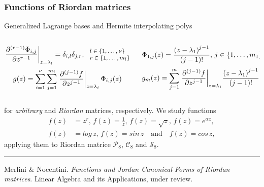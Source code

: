 \documentclass[9pt]{beamer}
\begin{document}
\begin{frame}[fragile]
\frametitle{Functions of Riordan matrices}
Generalized Lagrange bases and Hermite interpolating polys
\begin{columns}
    \begin{column}{0.5\textwidth}
        \begin{displaymath}
        \footnotesize
        \left. \frac{\partial^{(r-1)}{\Phi_{i,j}}}{\partial{z}^{r-1}} \right|_{z=\lambda_{l}} = \delta_{i,l}\delta_{j,r},
        \, 
        \begin{array}{l} 
            l\in \lbrace 1, \ldots, \nu \rbrace \\
            r \in \lbrace 1, \ldots, m_{l} \rbrace
        \end{array}
        \end{displaymath}
        \begin{displaymath}
        \footnotesize
        g(z) = \sum_{i=1}^{\nu}{\sum_{j=1}^{m_{i}}{ \left.
        \frac{\partial^{(j-1)}{f}}{\partial{z}^{j-1}} \right|_{z=\lambda_{i}}\Phi_{i,j}(z) }}
        \end{displaymath}
    \end{column}
    \vrule{}
    \begin{column}{0.5\textwidth}
        \begin{displaymath}
        \footnotesize
          \Phi_{1,j}(z) = \frac{\left(z-\lambda_{1}\right)^{j-1}}{(j-1)!}, 
          \, j\in \lbrace 1,\ldots, m_{1} \rbrace
        \end{displaymath}
        \begin{displaymath}
        \footnotesize
        g_{m}(z) = {\sum_{j=1}^{m}{ \left.
        \frac{\partial^{(j-1)}{f}}{\partial{z}^{j-1}} \right|_{z=\lambda_{1}}}}
        \frac{\left(z-\lambda_{1}\right)^{j-1}}{(j-1)!}
        \end{displaymath}
    \end{column}
\end{columns}
for \textit{arbitrary} and \textit{Riordan} matrices, respectively.
We study functions
\begin{displaymath}
\begin{split}
f(z)&=z^{r},\,{f(z)=\frac{1}{z}},\,{f(z)=\sqrt{z}},\,{f(z)=e^{\alpha z}},\\
f(z)&=log\,{z},\,f(z)=sin\,{z}\quad\text{and}\quad f(z)=cos\,{z},
\end{split}
\end{displaymath}
applying them to Riordan matrice $\mathcal{P}_{8}$, $\mathcal{C}_{8}$ and 
$\mathcal{S}_{8}$.
\vfill
\noindent\rule{\textwidth}{0.1pt}
{\footnotesize
Merlini \& Nocentini. \textit{Functions and Jordan Canonical Forms of Riordan
matrices}. \newline Linear Algebra and its Applications, under review.}
\end{frame}
\end{document}
